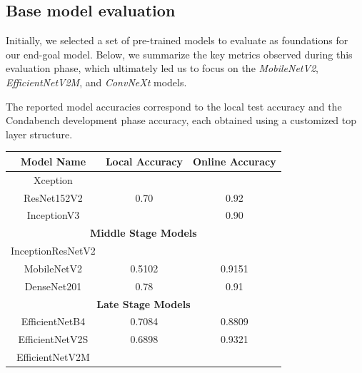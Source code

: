 \documentclass[11pt]{article}
\begin{document}
\begin{multicols}{2}
        \subsection{Base model evaluation}
        
        Initially, we selected a set of pre-trained models to evaluate as foundations for our end-goal model.
        Below, we summarize the key metrics observed during this evaluation phase, which ultimately led us to focus on the \textit{MobileNetV2}, \textit{EfficientNetV2M}, and \textit{ConvNeXt} models.
        
        The reported model accuracies correspond to the local test accuracy and the Condabench development phase accuracy, each obtained using a customized top layer structure.  
        \begin{table}[H]
            \centering
            \setlength{\tabcolsep}{4pt}
            \small
            \begin{tabular}{|c|c|c|}
                \hline

                \textbf{Model Name} & \textbf{Local Accuracy} & \textbf{Online Accuracy} \\ \hline
                \hline
                Xception            &  &  \\ \hline
                ResNet152V2         & 0.70 & 0.92 \\ \hline
                InceptionV3         &  & 0.90 \\ \hline
                \multicolumn{3}{|c|}{\textbf{Middle Stage Models}} \\ \hline
                InceptionResNetV2   &  &  \\ \hline
                MobileNetV2         & 0.5102 & 0.9151 \\ \hline
                DenseNet201         & 0.78 & 0.91 \\ \hline
                \multicolumn{3}{|c|}{\textbf{Late Stage Models}} \\ \hline
                EfficientNetB4      & 0.7084 & 0.8809 \\ \hline
                EfficientNetV2S     & 0.6898 & 0.9321 \\ \hline
                EfficientNetV2M     &  &  \\ \hline
            \end{tabular}
        \end{table}
        

\end{multicols}
\end{document}
